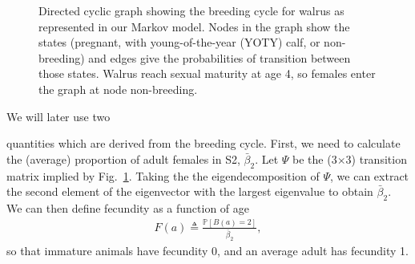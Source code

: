 \begin{figure}

\caption{Directed cyclic graph showing the breeding cycle for walrus as represented
in our Markov model. Nodes in the graph show the states (pregnant,
with young-of-the-year (YOTY) calf, or non-breeding) and edges give
the probabilities of transition between those states. Walrus reach
sexual maturity at age 4, so females enter the graph at node non-breeding.
\label{fig:Breeding-cycle}}
\end{figure}

We will later use two%
\begin{comment}
Only B2 is described? What is the other thing we need?
\end{comment}
{} quantities which are derived from the breeding cycle. First, we need
to calculate the (average) proportion of adult females in S2, $\bar{\beta}_{2}$.
Let $\Psi$ be the (3$\times$3) transition matrix implied by Fig.~\ref{fig:Breeding-cycle}.
Taking the the eigendecomposition of $\Psi$, we can extract the second
element of the eigenvector with the largest eigenvalue to obtain $\bar{\beta}_{2}$.
We can then define fecundity as a function of age
\begin{gather}
F\left(a\right)\triangleq\frac{\mathbb{P}\left[B\left(a\right)=2\right]}{\bar{\beta}_{2}},\label{eq:fec-def}
\end{gather}
so that immature animals have fecundity 0, and an average adult has
fecundity 1.

